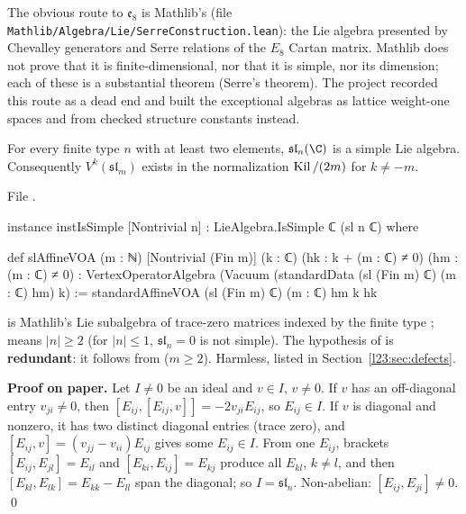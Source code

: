 \begin{warning}[title={Dead end: Mathlib's Serre construction}]\label{l23:warn:serre}
The obvious route to $\mathfrak e_8$ is Mathlib's  (file
\texttt{Mathlib/Algebra/Lie/SerreConstruction.lean}): the Lie algebra presented by Chevalley generators and Serre relations of
the $E_8$ Cartan matrix. Mathlib does not prove that it is finite-dimensional, nor that it is simple, nor its dimension; each
of these is a substantial theorem (Serre's theorem). The project recorded this route as a dead end and
built the exceptional algebras as lattice weight-one spaces and from checked structure constants instead.
\end{warning}

\begin{theorem}\label{l23:thm:sln}
For every finite type $n$ with at least two elements, $\mathfrak{sl}_n(\C)$ is a simple Lie algebra. Consequently
$V^k(\mathfrak{sl}_m)$ exists in the normalization $\operatorname{Kil}/(2m)$ for $k\ne-m$.
\end{theorem}
\noindent File .
\begin{leancode}
instance instIsSimple [Nontrivial n] : LieAlgebra.IsSimple ℂ (sl n ℂ) where

def slAffineVOA (m : ℕ) [Nontrivial (Fin m)] (k : ℂ) (hk : k + (m : ℂ) ≠ 0) (hm : (m : ℂ) ≠ 0) :
    VertexOperatorAlgebra (Vacuum (standardData (sl (Fin m) ℂ) (m : ℂ) hm) k) :=
  standardAffineVOA (sl (Fin m) ℂ) (m : ℂ) hm k hk
\end{leancode}

\begin{dictionary}
 is Mathlib's Lie subalgebra of trace-zero matrices indexed by the finite type ;
\lean{[Nontrivial n]} means $|n|\ge2$ (for $|n|\le1$, $\mathfrak{sl}_n=0$ is not simple). The hypothesis 
of  is \textbf{redundant}: it follows from  ($m\ge2$). Harmless, listed in
Section~\ref{l23:sec:defects}.
\end{dictionary}

\textbf{Proof on paper.} Let $I\ne0$ be an ideal and $v\in I$, $v\ne0$. If $v$ has an off-diagonal entry $v_{ji}\ne0$, then
$[E_{ij},[E_{ij},v]]=-2v_{ji}E_{ij}$, so $E_{ij}\in I$. If $v$ is diagonal and nonzero, it has two distinct diagonal entries (trace
zero), and $[E_{ij},v]=(v_{jj}-v_{ii})E_{ij}$ gives some $E_{ij}\in I$. From one $E_{ij}$, brackets
$[E_{ij},E_{jl}]=E_{il}$ and $[E_{ki},E_{ij}]=E_{kj}$ produce all $E_{kl}$, $k\ne l$, and then $[E_{kl},E_{lk}]=E_{kk}-E_{ll}$ span the
diagonal; so $I=\mathfrak{sl}_n$. Non-abelian: $[E_{ij},E_{ji}]\ne0$. \qed

